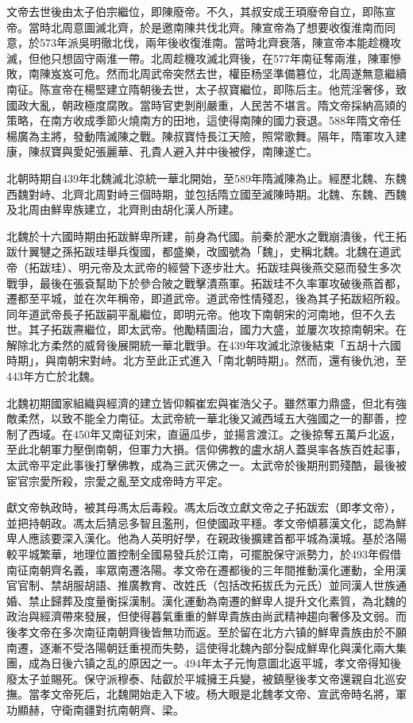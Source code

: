 文帝去世後由太子伯宗繼位，即陳廢帝。不久，其叔安成王頊廢帝自立，即陈宣帝。當時北周意圖滅北齊，於是邀南陳共伐北齊。陳宣帝為了想要收復淮南而同意，於573年派吳明徹北伐，兩年後收復淮南。當時北齊衰落，陳宣帝本能趁機攻滅，但他只想固守兩淮一帶。北周趁機攻滅北齊後，在577年南征奪兩淮，陳軍慘敗，南陳岌岌可危。然而北周武帝突然去世，權臣杨坚準備篡位，北周遂無意繼續南征。陈宣帝在楊堅建立隋朝後去世，太子叔寶繼位，即陈后主。他荒淫奢侈，致國政大亂，朝政極度腐敗。當時官吏剝削嚴重，人民苦不堪言。隋文帝採納高熲的策略，在南方收成季節火燒南方的田地，這使得南陳的國力衰退。588年隋文帝任楊廣為主將，發動隋滅陳之戰。陳叔寶恃長江天險，照常歌舞。隔年，隋軍攻入建康，陳叔寶與愛妃張麗華、孔貴人避入井中後被俘，南陳遂亡。

北朝時期自439年北魏滅北涼統一華北開始，至589年隋滅陳為止。經歷北魏、东魏西魏對峙、北齊北周對峙三個時期，並包括隋立國至滅陳時期。北魏、东魏、西魏及北周由鮮卑族建立，北齊則由胡化漢人所建。

北魏於十六國時期由拓跋鮮卑所建，前身為代國。前秦於淝水之戰崩潰後，代王拓跋什翼犍之孫拓跋珪舉兵復國，都盛樂，改國號為「魏」，史稱北魏。北魏在道武帝（拓跋珪）、明元帝及太武帝的經營下逐步壯大。拓跋珪與後燕交惡而發生多次戰爭，最後在張袞幫助下於參合陂之戰擊潰燕軍。拓跋珪不久率軍攻破後燕首都，遷都至平城，並在次年稱帝，即道武帝。道武帝性情殘忍，後為其子拓跋紹所殺。同年道武帝長子拓跋嗣平亂繼位，即明元帝。他攻下南朝宋的河南地，但不久去世。其子拓跋燾繼位，即太武帝。他勵精圖治，國力大盛，並屢次攻掠南朝宋。在解除北方柔然的威脅後展開統一華北戰爭。在439年攻滅北涼後結束「五胡十六國時期」，與南朝宋對峙。北方至此正式進入「南北朝時期」。然而，還有後仇池，至443年方亡於北魏。

北魏初期國家組織與經濟的建立皆仰賴崔宏與崔浩父子。雖然軍力鼎盛，但北有強敵柔然，以致不能全力南征。太武帝統一華北後又滅西域五大強國之一的鄯善，控制了西域。在450年又南征刘宋，直逼瓜步，並揚言渡江。之後掠奪五萬戶北返，至此北朝軍力壓倒南朝，但軍力大損。信仰佛教的盧水胡人蓋吳率各族百姓起事，太武帝平定此事後打擊佛教，成為三武灭佛之一。太武帝於後期刑罰殘酷，最後被宦官宗愛所殺，宗愛之亂至文成帝時方平定。

獻文帝執政時，被其母馮太后毒殺。馮太后改立獻文帝之子拓跋宏（即孝文帝），並把持朝政。馮太后猜忌多智且濫刑，但使國政平穩。孝文帝傾慕漢文化，認為鮮卑人應該要深入漢化。他為人英明好學，在親政後擴建首都平城為漢城。基於洛陽較平城繁華，地理位置控制全國易發兵於江南，可擺脫保守派勢力，於493年假借南征南朝齊名義，率眾南遷洛陽。孝文帝在遷都後的三年間推動漢化運動，全用漢官官制、禁胡服胡語、推廣教育、改姓氏（包括改拓拔氏为元氏）並同漢人世族通婚、禁止歸葬及度量衡採漢制。漢化運動為南遷的鮮卑人提升文化素質，為北魏的政治與經濟帶來發展，但使得暮氣重重的鮮卑貴族由尚武精神趨向奢侈及文弱。而後孝文帝在多次南征南朝齊後皆無功而返。至於留在北方六镇的鮮卑貴族由於不願南遷，逐漸不受洛陽朝廷重視而失勢，這使得北魏內部分裂成鮮卑化與漢化兩大集團，成為日後六镇之乱的原因之一。494年太子元恂意圖北返平城，孝文帝得知後廢太子並賜死。保守派穆泰、陆叡於平城擁王兵變，被鎮壓後孝文帝還親自北巡安撫。當孝文帝死后，北魏開始走入下坡。杨大眼是北魏孝文帝、宣武帝時名將，軍功顯赫，守衛南疆對抗南朝齊、梁。

